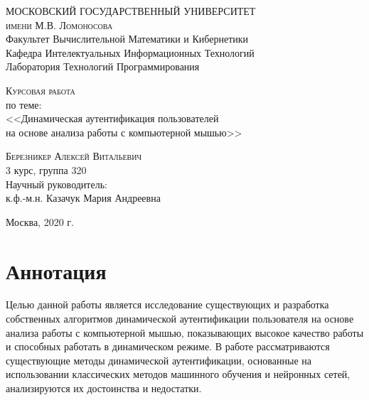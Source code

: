 \documentclass[12pt]{article}
\begin{document}
    \begin{titlepage}
        \BgThispage %
        \begin{center}
            \textsc{
            \large
            МОСКОВСКИЙ ГОСУДАРСТВЕННЫЙ УНИВЕРСИТЕТ \\
            имени М.В. Ломоносова
            } \\
            [5mm]

            Факультет Вычислительной Математики и Кибернетики \\
            Кафедра Интелектуальных Информационных Технологий \\
            Лаборатория Технологий Программирования 
            \vfill
    
            \textsc{Курсовая работа} \\
            по теме: \\
            [5mm]
            {\LARGE
            <<Динамическая аутентификация пользователей \\
            на основе анализа работы с компьютерной мышью>>
            }
            \vfill
            \begin{flushright}
                \textsc{Березникер Алексей Витальевич} \\
                3 курс, группа 320 \\
                [5mm]
                Научный руководитель: \\
                к.ф.-м.н. Казачук Мария Андреевна \\
            \end{flushright}
            \vfill

            Москва, 2020 г.
        \end{center}
    \end{titlepage}



    \tableofcontents
    \newpage


    \onehalfspacing %


    \section{Аннотация}
    \label{sec:Annotation}

    \par Целью данной работы является исследование существующих и разработка собственных алгоритмов динамической аутентификации пользователя на основе анализа работы с компьютерной мышью, показывающих высокое качество работы и способных работать в динамическом режиме. В работе рассматриваются существующие методы динамической аутентификации, основанные на использовании классических методов машинного обучения и нейронных сетей, анализируются их достоинства и недостатки.
\end{document}
